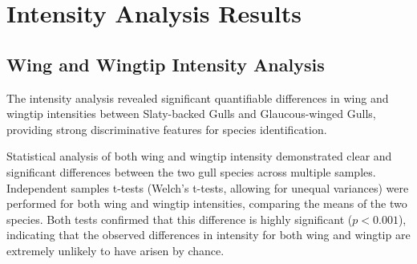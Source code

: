 \documentclass[a4paper,12pt]{report}
\begin{document}
\section{Intensity Analysis Results}

\subsection{Wing and Wingtip Intensity Analysis}

The intensity analysis revealed significant quantifiable differences in wing and wingtip intensities between Slaty-backed Gulls and Glaucous-winged Gulls, providing strong discriminative features for species identification.

Statistical analysis of both wing and wingtip intensity demonstrated clear and significant differences between the two gull species across multiple samples. Independent samples t-tests (Welch's t-tests, allowing for unequal variances) were performed for both wing and wingtip intensities, comparing the means of the two species. Both tests  confirmed that this difference is highly significant ($p < 0.001$), indicating that the observed differences in intensity for both wing and wingtip are extremely unlikely to have arisen by chance.

\begin{table}[H]
    \centering
    \caption{Wing and Wingtip Intensity Statistical Summary}
    \label{tab:intensity-stats-combined}
\end{table}
\end{document}

